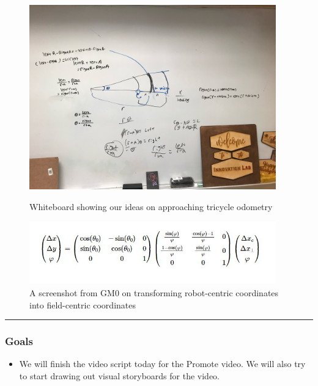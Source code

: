 \begin{figure}[ht]
\centering
\begin{minipage}[b]{.48\textwidth}
  \centering
  \includegraphics[width=0.95\textwidth]{Meetings/January/01-06-22/1.6.22 Board with Odometry - James Hu.jpg}
  \caption{Whiteboard showing our ideas on approaching tricycle odometry}
  \label{fig:010622_1}
\end{minipage}%
\hfill%
\begin{minipage}[b]{.48\textwidth}
  \centering
  \includegraphics[width=0.95\textwidth]{Meetings/January/01-06-22/1.6.22 Corrected Pose Equation - James Hu.JPG}
  \caption{A screenshot from GM0 on transforming robot-centric coordinates into field-centric coordinates}
  \label{fig:010622_2}
\end{minipage}
\end{figure}

\noindent\hfil\rule{\textwidth}{.4pt}\hfil
\subsubsection*{Goals}
\begin{itemize}
    \item We will finish the video script today for the Promote video. We will also try to start drawing out visual storyboards for the video.

\end{itemize} 

